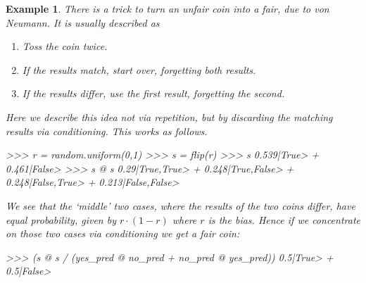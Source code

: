 \documentclass[leqno]{tufte-book} %
\newtheorem{example}[theorem]{Example}
\begin{document}
\begin{example}
\label{ex:vonneumancoin}
There is a trick to turn an unfair coin into a fair, due to von
Neumann.
It is usually described as
\begin{enumerate}
\item Toss the coin twice.
\item If the results match, start over, forgetting both results.
\item If the results differ, use the first result, forgetting the second.
\end{enumerate}

\noindent Here we describe this idea not via repetition, but by
discarding the matching results via conditioning. This works as
follows.
\begin{python}
>>> r = random.uniform(0,1)
>>> s = flip(r)
>>> s
0.539|True> + 0.461|False>
>>> s @ s
0.29|True,True> + 0.248|True,False> + 0.248|False,True> + 0.213|False,False>
\end{python}

\noindent We see that the `middle' two cases, where the results of the
two coins differ, have equal probability, given by $r \cdot (1-r)$
where $r$ is the bias. Hence if we concentrate on those two cases via
conditioning we get a fair coin:
\begin{python}
>>> (s @ s / (yes_pred @ no_pred + no_pred @ yes_pred)) %
0.5|True> + 0.5|False>
\end{python}
\end{example}
\end{document}
